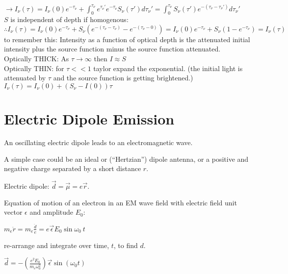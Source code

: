 \documentclass[12pt]{report}
\begin{document}
\(\rightarrow I_\nu(\tau) =   I_\nu(0)e^{-\tau_\nu}  +   \int_0^{\tau_\nu} e^{\tau_\nu'}e^{-\tau_\nu}S_\nu(\tau') d\tau_\nu' =\int_0^{\tau_\nu} S_\nu(\tau')  e^{-(\tau_\nu-\tau_\nu')}d\tau_\nu'\) \\
$S$ is independent of depth if homogenous:\\
\( \therefore  I_\nu(\tau) =  I_\nu(0)e^{-\tau_\nu} + S_\nu (e^{-(\tau_\nu-\tau_\nu)}-e^{-(\tau_\nu-0)})=\boxed{ I_\nu(0)e^{-\tau_\nu}  +S_\nu (1-e^{-\tau_\nu}) =I_\nu(\tau) }\)
to remember this: Intensity as a function of optical depth is the attenuated initial intensity plus the source function minus the source function attenuated.\\
Optically THICK: As $\tau\rightarrow \infty$ then $I\approx S$\\
Optically THIN: for $\tau<<1$ taylor expand the exponential.  (the initial light is attenuated by $\tau$ and the source function is getting brightened.)\\
$I_\nu(\tau)=I_\nu(0)+(S_\nu-I(0))\tau$


 
 \section{Electric Dipole Emission}
 
 An oscillating electric dipole leads to an electromagnetic wave. 
 
 A simple case could be an ideal or (``Hertzian'') dipole antenna, or a positive and negative charge separated by a short distance $r$. 
 
 Electric dipole:  $\vec{d}=\vec{\mu}=e\vec{r}$.
 
 Equation of motion of an electron in an EM wave field with electric field unit vector $\epsilon$ and amplitude $E_0$:
 
 $m_e\ddot{r}=m_e\frac{\ddot{d}}{e}=e\vec{\epsilon}E_0\sin{\omega_0 \ t}$
 
 re-arrange and integrate over time, $t$, to find $d$.
 
 $\vec{d}=-(\frac{e^2E_0}{m_e \omega_0^2})\vec{\epsilon}\sin(\omega_0 t)$
 
\end{document}
